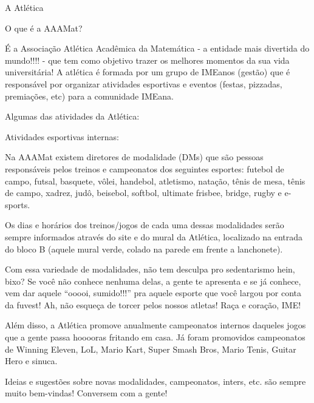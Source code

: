 \begin{secao}{A Atlética} %

\begin{subsecao}{O que é a AAAMat?}

É a Associação Atlética Acadêmica da Matemática - a entidade mais divertida do
mundo!!!! - que tem como objetivo trazer os melhores momentos da sua vida
universitária! A atlética é formada por um grupo de IMEanos (gestão) que é
responsável por organizar atividades esportivas e eventos (festas, pizzadas,
premiações, etc) para a comunidade IMEana.

\end{subsecao}

Algumas das atividades da Atlética:

\begin{subsecao}{Atividades esportivas internas:}

Na AAAMat existem diretores de modalidade (DMs) que são pessoas responsáveis
pelos treinos e campeonatos dos seguintes esportes: futebol de campo, futsal,
basquete, vôlei, handebol, atletismo, natação, tênis de mesa, tênis de campo,
xadrez, judô, beisebol, softbol, ultimate frisbee, bridge, rugby e e-sports.

Os dias e horários dos treinos/jogos de cada uma dessas modalidades serão
sempre informados através do site e do mural da Atlética, localizado na entrada
do bloco B (aquele mural verde, colado na parede em frente a lanchonete).

Com essa variedade de modalidades, não tem desculpa pro sedentarismo hein,
bixo? Se você não conhece nenhuma delas, a gente te apresenta e se já conhece,
vem dar aquele “ooooi, sumido!!!” pra aquele esporte que você largou por conta
da fuvest! Ah, não esqueça de torcer pelos nossos atletas! Raça e coração, IME!

Além disso, a Atlética promove anualmente campeonatos internos daqueles jogos
que a gente passa hooooras fritando em casa. Já foram promovidos campeonatos de
Winning Eleven, LoL, Mario Kart, Super Smash Bros, Mario Tenis, Guitar Hero e
sinuca.

Ideias e sugestões sobre novas modalidades, campeonatos, inters, etc. são
sempre muito  bem-vindas! Conversem com a gente!

\end{subsecao}


\end{secao}
